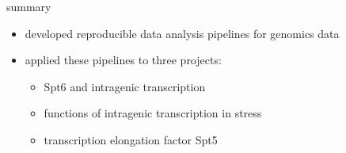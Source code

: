 \documentclass[aspectratio=169]{beamer}
\begin{document}
\begin{frame}{summary}
    \begin{itemize}
        \setlength{\itemsep}{1em}
        \item developed reproducible data analysis pipelines for genomics data
        \item applied these pipelines to three projects:
            \begin{itemize}
                \item Spt6 and intragenic transcription
                \item functions of intragenic transcription in stress
                \item transcription elongation factor Spt5
            \end{itemize}
    \end{itemize}
\end{frame}
\end{document}
